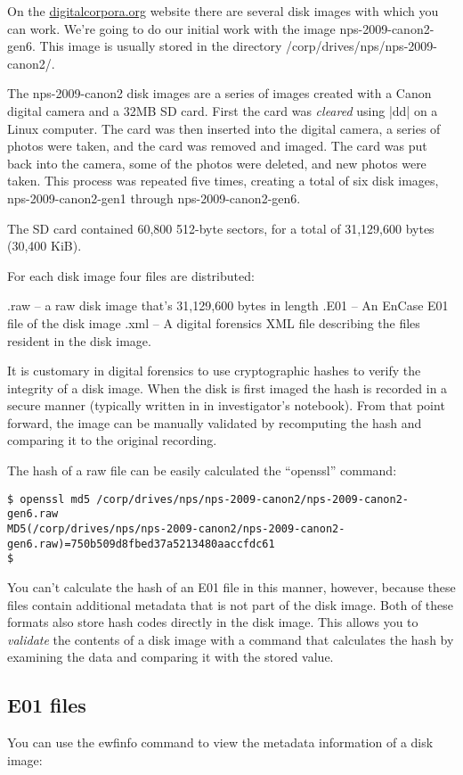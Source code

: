 On the \url{digitalcorpora.org} website there are several disk images with
which you can work. We're going to do our initial work with the image
nps-2009-canon2-gen6. This image is usually stored in the directory
/corp/drives/nps/nps-2009-canon2/.

The nps-2009-canon2 disk images are a series of images created with a
Canon digital camera and a 32MB SD card. First the card was
\emph{cleared} using |dd| on a Linux computer. The card was then
inserted into the digital camera, a series of photos were taken, and
the card was removed and imaged. The card was put back into the
camera, some of the photos were deleted, and new photos were
taken. This process was repeated five times, creating a total of six
disk images, nps-2009-canon2-gen1 through nps-2009-canon2-gen6.

The SD card contained 60,800 512-byte sectors, for a total of
31,129,600 bytes (30,400 KiB).

For each disk image four files are distributed:

   .raw -- a raw disk image that's 31,129,600 bytes in length
   .E01 -- An EnCase E01 file of the disk image
   .xml -- A digital forensics XML file describing the files resident
           in the disk image.


It is customary in digital forensics to use cryptographic hashes to
verify the integrity of a disk image. When the disk is first imaged
the hash is recorded in a secure manner (typically written in in
investigator's notebook). From that point forward, the image can be
manually validated by recomputing the hash and comparing it to the
original recording.

The hash of a raw file can be easily calculated the ``openssl''
command:

\begin{Verbatim}
$ openssl md5 /corp/drives/nps/nps-2009-canon2/nps-2009-canon2-gen6.raw
MD5(/corp/drives/nps/nps-2009-canon2/nps-2009-canon2-gen6.raw)=750b509d8fbed37a5213480aaccfdc61
$ 
\end{Verbatim}

You can't calculate the hash of an E01 file in this manner,
however, because these files contain additional metadata that is not
part of the disk image.  Both of these formats also store hash codes
directly in the disk image. This allows you to \emph{validate} the
contents of a disk image with a command that calculates the hash by
examining the data and comparing it with the stored value. 

\subsection{E01 files}
You can use the ewfinfo command to view the metadata information of a
disk image:

